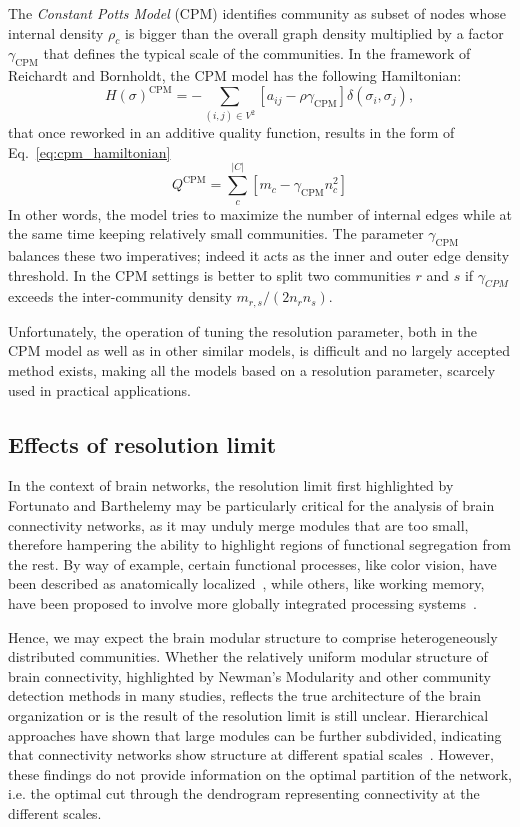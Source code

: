 The \emph{Constant Potts Model} (CPM) identifies community as subset of nodes whose internal density $\rho_c$ is bigger than the overall graph density multiplied by a factor $\gamma_{\textrm{CPM}}$ that defines the typical scale of the communities. In the framework of Reichardt and Bornholdt, the CPM model has the following Hamiltonian: 
\begin{equation}\label{eq:cpm_hamiltonian}
H(\sigma)^{\textrm{CPM}} = - \sum \limits_{(i,j) \in V^2} \left[ a_{ij} - \rho \gamma_{\textrm{CPM}} \right] \delta(\sigma_i,\sigma_j),
\end{equation}
that once reworked in an additive quality function, results in the form of Eq.~\ref{eq:cpm_hamiltonian} 
\begin{equation}\label{eq:cpm_ermodel}
Q^{\textrm{CPM}} = \sum \limits_c^{|C|} \left[m_c - \gamma_{\textrm{CPM}} n_c^2 \right] 
\end{equation}
In other words, the model tries to maximize the number of internal edges while at the same time keeping relatively small communities. The parameter $\gamma_{\textrm{CPM}}$ balances these two imperatives; indeed it acts as the inner and outer edge density threshold.
In the CPM settings is better to split two communities $r$ and $s$ if $\gamma_{CPM}$ exceeds the inter-community density $m_{r,s}/(2n_r n_s)$.

Unfortunately, the operation of tuning the resolution parameter, both in the CPM model as well as in other similar models, is difficult and no largely accepted method exists, making all the models based on a resolution parameter, scarcely used in practical applications.

\subsection{Effects of resolution limit}
In the context of brain networks, the resolution limit first highlighted by Fortunato and Barthelemy may be particularly critical for the analysis of brain connectivity networks, as it may unduly merge modules that are too small, therefore hampering the ability to highlight regions of functional segregation from the rest.
By way of example, certain functional processes, like color vision, have been described as anatomically localized~\cite{zeki1998}, while others, like working memory, have been proposed to involve more globally integrated processing systems~\cite{baddeley2003}.

Hence, we may expect the brain modular structure to comprise heterogeneously distributed communities. Whether the relatively uniform modular structure of brain connectivity, highlighted by Newman's Modularity and other community detection methods in many studies, reflects the true architecture of the brain organization or is the result of the resolution limit is still unclear.
Hierarchical approaches have shown that large modules can be further subdivided, indicating that connectivity networks show structure at different spatial scales~\cite{meunier2009}.
However, these findings do not provide information on the optimal partition of the network, i.e. the optimal cut through the dendrogram representing connectivity at the different scales.

